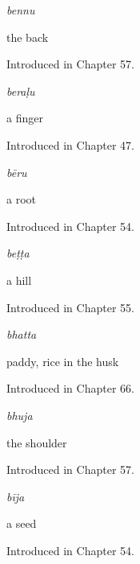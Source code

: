 \noindent\begin{minipage}[t]{\linewidth}
\raggedright
\textbf{}\enspace\emph{bennu}\par
\small the back\par
\footnotesize Introduced in Chapter 57.
\end{minipage}\par\medskip

\noindent\begin{minipage}[t]{\linewidth}
\raggedright
\textbf{}\enspace\emph{beraḷu}\par
\small a finger\par
\footnotesize Introduced in Chapter 47.
\end{minipage}\par\medskip

\noindent\begin{minipage}[t]{\linewidth}
\raggedright
\textbf{}\enspace\emph{bēru}\par
\small a root\par
\footnotesize Introduced in Chapter 54.
\end{minipage}\par\medskip

\noindent\begin{minipage}[t]{\linewidth}
\raggedright
\textbf{}\enspace\emph{beṭṭa}\par
\small a hill\par
\footnotesize Introduced in Chapter 55.
\end{minipage}\par\medskip

\noindent\begin{minipage}[t]{\linewidth}
\raggedright
\textbf{}\enspace\emph{bhatta}\par
\small paddy, rice in the husk\par
\footnotesize Introduced in Chapter 66.
\end{minipage}\par\medskip

\noindent\begin{minipage}[t]{\linewidth}
\raggedright
\textbf{}\enspace\emph{bhuja}\par
\small the shoulder\par
\footnotesize Introduced in Chapter 57.
\end{minipage}\par\medskip

\noindent\begin{minipage}[t]{\linewidth}
\raggedright
\textbf{}\enspace\emph{bīja}\par
\small a seed\par
\footnotesize Introduced in Chapter 54.
\end{minipage}\par\medskip

